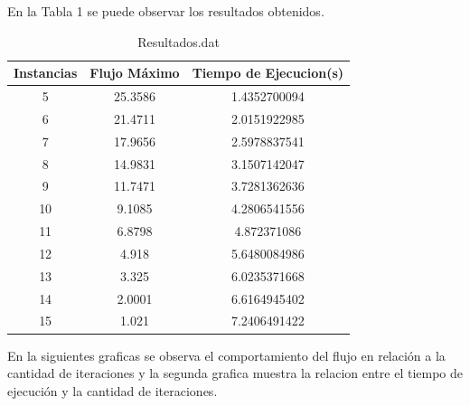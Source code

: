 \documentclass[12pt,letterpaper]{article}
\begin{document}
En la Tabla 1 se puede observar los resultados obtenidos.

\begin{table}[htbp]
\begin{center}
\begin{tabular}{|c|c|c|}
\hline
Instancias & Flujo Máximo & Tiempo de Ejecucion(s) \\ \hline \hline
5 & 25.3586 & 1.4352700094\\ \hline
6 & 21.4711 & 2.0151922985\\ \hline
7 & 17.9656 & 2.5978837541\\ \hline
8 & 14.9831 & 3.1507142047\\ \hline
9 & 11.7471 & 3.7281362636\\ \hline
10 & 9.1085 & 4.2806541556\\ \hline
11 & 6.8798 & 4.872371086\\ \hline
12 & 4.918 & 5.6480084986\\ \hline
13 & 3.325 & 6.0235371668\\ \hline
14 & 2.0001 & 6.6164945402\\ \hline
15 & 1.021 & 7.2406491422\\ \hline
\end{tabular}
\caption{\footnotesize Resultados.dat\cite{Resultados.dat}}
\end{center}
\end{table}


En la siguientes graficas se observa el comportamiento del flujo en relación a la cantidad de iteraciones y la segunda grafica muestra la relacion entre el tiempo de ejecución y la cantidad de iteraciones.
\end{document}

